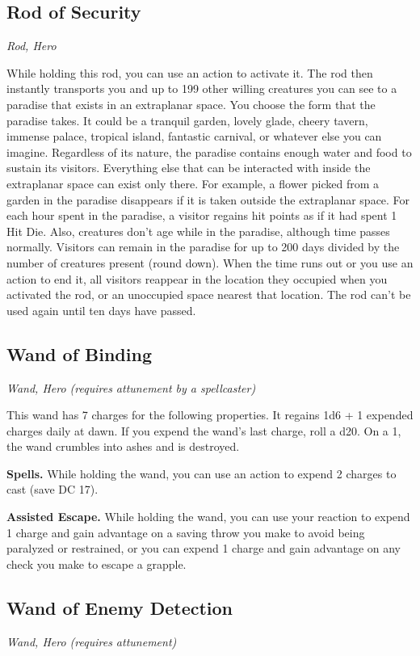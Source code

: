 \subsection{Rod of Security}
\textit{Rod, Hero} 

While holding this rod, you can use an action to activate it. The rod then instantly transports you and up to 199 other willing creatures you can see to a paradise that exists in an extraplanar space. You choose the form that the paradise takes. It could be a tranquil garden, lovely glade, cheery tavern, immense palace, tropical island, fantastic carnival, or whatever else you can imagine. Regardless of its nature, the paradise contains enough water and food to sustain its visitors. Everything else that can be interacted with inside the extraplanar space can exist only there. For example, a flower picked from a garden in the paradise disappears if it is taken outside the extraplanar space.  For each hour spent in the paradise, a visitor regains hit points as if it had spent 1 Hit Die. Also, creatures don't age while in the paradise, although time passes normally. Visitors can remain in the paradise for up to 200 days divided by the number of creatures present (round down).  When the time runs out or you use an action to end it, all visitors reappear in the location they occupied when you activated the rod, or an unoccupied space nearest that location. The rod can't be used again until ten days have passed.

\subsection{Wand of Binding}
\textit{Wand, Hero (requires attunement by a spellcaster)} 

This wand has 7 charges for the following properties. It regains 1d6 + 1 expended charges daily at dawn. If you expend the wand's last charge, roll a d20. On a 1, the wand crumbles into ashes and is destroyed.

\textbf{Spells.} While holding the wand, you can use an action to expend 2 charges to cast  (save DC 17).

\textbf{Assisted Escape.} While holding the wand, you can use your reaction to expend 1 charge and gain advantage on a saving throw you make to avoid being paralyzed or restrained, or you can expend 1 charge and gain advantage on any check you make to escape a grapple.

\subsection{Wand of Enemy Detection}
\textit{Wand, Hero (requires attunement)}

